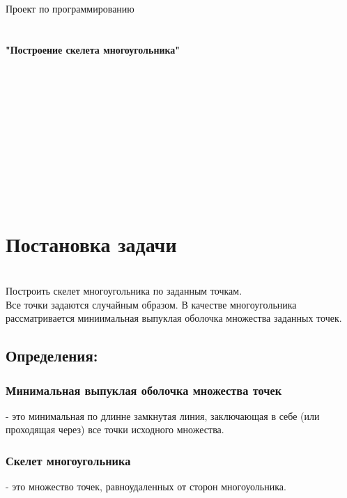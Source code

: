 \documentclass[a4paper,11pt]{article}
\begin{document}
\maketitle
\Huge {Проект по программированию}
\\
\\
\\
\huge \textbf {"Построение скелета многоугольника"}
\\
\\
\\
\\
\\
\\
\\
\\
\\
\\
\author{Автор: студентка 151 группы}
\\
\author{Сухоруковой Екатерины}



\newpage

\maketitle
\tableofcontents


\newpage
\huge {\chapter{Постановка задачи}}
\\
Построить скелет многоугольника по заданным точкам.
\\Все точки задаются случайным образом. В качестве многоугольника рассматривается миниимальная выпуклая оболочка множества заданных точек. 

\section {Определения:}
\subsection {Минимальная выпуклая оболочка множества точек} 
- это минимальная по длинне замкнутая линия, заключающая в себе (или проходящая через) все точки исходного множества.

\subsection {Скелет многоугольника}
- это множество точек, равноудаленных от сторон многоуольника.
\end{document}

